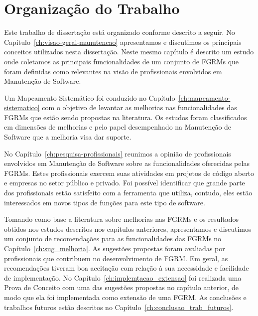 \section{Organização do Trabalho}
\label{sec:intro-organizacao-dissertacao}

Este trabalho de dissertação está organizado conforme descrito a seguir. No
Capítulo~\ref{ch:visao-geral-manutencao} apresentamos e discutimos os principais
conceitos utilizados nesta dissertação. Neste mesmo capítulo é descrito um
estudo onde coletamos as principais funcionalidades de um conjunto de FGRMs que
foram definidas como relevantes na visão de profissionais envolvidos em
Manutenção de Software.

Um Mapeamento Sistemático foi conduzido no
Capítulo~\ref{ch:mapeamento-sistematico} com o objetivo de levantar as melhorias
nas funcionalidades das FGRMs que estão sendo propostas na literatura. Os
estudos foram classificados em dimensões de melhorias e pelo papel desempenhado
na Manutenção de Software que a melhoria visa dar suporte.

No Capítulo~\ref{ch:pesquisa-profissionais} reunimos a opinião de profissionais
envolvidos em Manutenção de Software sobre as funcionalidades oferecidas pelas
FGRMs. Estes profissionais exercem suas atividades em projetos de código aberto
e empresas no setor público e privado. Foi possível identificar que grande parte
dos profissionais estão satisfeito com a ferramenta que utiliza, contudo, eles
estão interessados em novos tipos de funções para este tipo de software.

Tomando como base a literatura sobre melhorias nas FGRMs e os resultados obtidos
nos estudos descritos nos capítulos anteriores, apresentamos e discutimos um
conjunto de recomendações para as funcionalidades das FGRMs no
Capítulo~\ref{ch:sug_melhoria}. As sugestões propostas foram avaliadas por
profissionais que contribuem no desenvolvimento de FGRM\@. Em geral, as
recomendações tiveram boa aceitação com relação à sua necessidade e facilidade
de implementação. No Capítulo~\ref{ch:implemtacao_extensao} foi realizada uma
Prova de Conceito com uma das sugestões propostas no capítulo anterior, de modo
que ela foi implementada como extensão de uma FGRM\@. As conclusões e trabalhos
futuros estão descritos no Capítulo~\ref{ch:conclusao_trab_futuros}.
